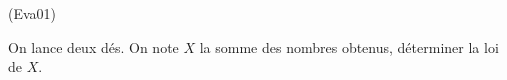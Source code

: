 \begin{tiny}(Eva01)\end{tiny} On lance deux dés. On note $X$ la somme des nombres obtenus, déterminer la loi de $X$.